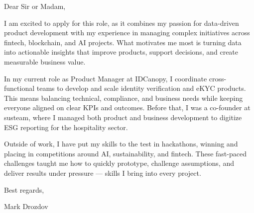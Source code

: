 \documentclass{ExpressiveCoverLetter}
\begin{document}
\coverletterheader[
    firstname=Mark,
    lastname=Drozdov,
    email=markdrozdov0@gmail.com,
    phone= +43-650-340-61-93,
    linkedin=mark-drozdov,
]

\vspace{0.10in}

Dear Sir or Madam,

I am excited to apply for this role, as it combines my passion for data-driven product development with my experience in managing complex initiatives across fintech, blockchain, and AI projects. What motivates me most is turning data into actionable insights that improve products, support decisions, and create measurable business value.

In my current role as Product Manager at IDCanopy, I coordinate cross-functional teams to develop and scale identity verification and eKYC products. This means balancing technical, compliance, and business needs while keeping everyone aligned on clear KPIs and outcomes. Before that, I was a co-founder at susteam, where I managed both product and business development to digitize ESG reporting for the hospitality sector.

Outside of work, I have put my skills to the test in hackathons, winning and placing in competitions around AI, sustainability, and fintech. These fast-paced challenges taught me how to quickly prototype, challenge assumptions, and deliver results under pressure — skills I bring into every project.

Best regards,

\vspace{0.05in}

Mark Drozdov
\end{document}

